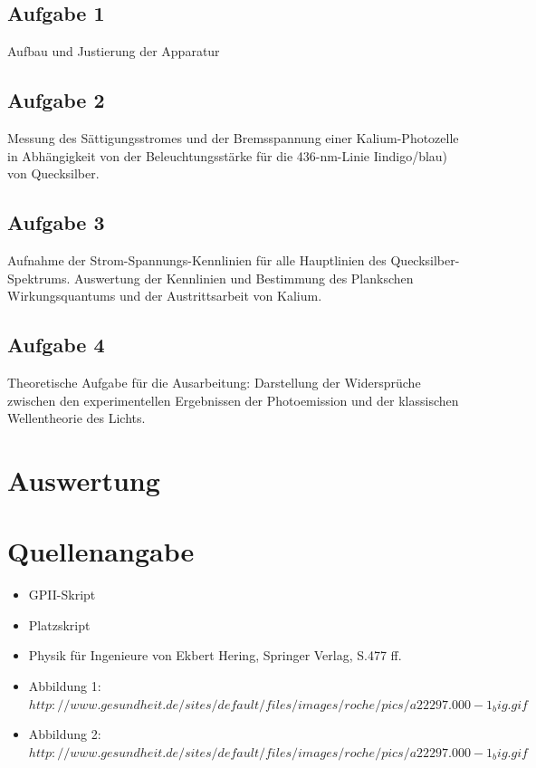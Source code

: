 \documentclass{article}
\begin{document}
\subsection{Aufgabe 1}
Aufbau und Justierung der Apparatur

\subsection{Aufgabe 2}
Messung des Sättigungsstromes und der Bremsspannung einer Kalium-Photozelle in Abhängigkeit von der Beleuchtungsstärke für die 436-nm-Linie Iindigo/blau) von Quecksilber.

\subsection{Aufgabe 3}
Aufnahme der Strom-Spannungs-Kennlinien für alle Hauptlinien des Quecksilber-Spektrums. Auswertung der Kennlinien und Bestimmung des Plankschen Wirkungsquantums und der Austrittsarbeit von Kalium.

\subsection{Aufgabe 4}
Theoretische Aufgabe für die Ausarbeitung: Darstellung der Widersprüche zwischen den experimentellen Ergebnissen der Photoemission und der klassischen Wellentheorie des Lichts.

\newpage
\section{Auswertung}














\section{Quellenangabe}
\begin{itemize}
\item GPII-Skript
\item Platzskript
\item Physik für Ingenieure von Ekbert Hering, Springer Verlag, S.477 ff.
\item Abbildung 1: \(http://www.gesundheit.de/sites/default/files/images/roche/pics/a22297.000-1_big.gif\)
\item Abbildung 2:  \(http://www.gesundheit.de/sites/default/files/images/roche/pics/a22297.000-1_big.gif\)
\end{itemize}

\newpage
\end{document}
